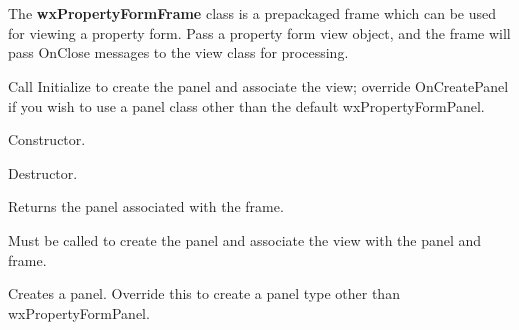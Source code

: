\section{}\label{wxpropertyformframe}

The {\bf wxPropertyFormFrame} class is a prepackaged frame which can
be used for viewing a property form. Pass a property form view object, and the frame
will pass OnClose messages to the view class for processing.

Call Initialize to create the panel and associate the view; override OnCreatePanel
if you wish to use a panel class other than the default wxPropertyFormPanel.



Constructor.



Destructor.



Returns the panel associated with the frame.



Must be called to create the panel and associate the view with the panel and frame.



Creates a panel. Override this to create a panel type other than wxPropertyFormPanel.



